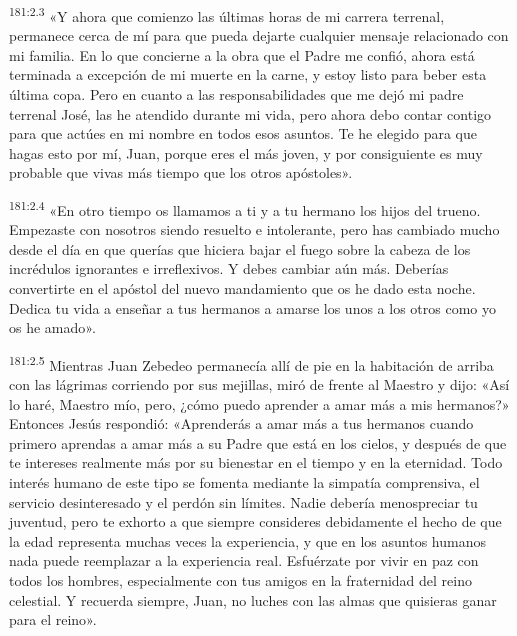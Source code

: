 \par 
\textsuperscript{181:2.3} «Y ahora que comienzo las últimas horas de mi carrera terrenal, permanece cerca de mí para que pueda dejarte cualquier mensaje relacionado con mi familia. En lo que concierne a la obra que el Padre me confió, ahora está terminada a excepción de mi muerte en la carne, y estoy listo para beber esta última copa. Pero en cuanto a las responsabilidades que me dejó mi padre terrenal José, las he atendido durante mi vida, pero ahora debo contar contigo para que actúes en mi nombre en todos esos asuntos. Te he elegido para que hagas esto por mí, Juan, porque eres el más joven, y por consiguiente es muy probable que vivas más tiempo que los otros apóstoles».

\par 
\textsuperscript{181:2.4} «En otro tiempo os llamamos a ti y a tu hermano los hijos del trueno. Empezaste con nosotros siendo resuelto e intolerante, pero has cambiado mucho desde el día en que querías que hiciera bajar el fuego sobre la cabeza de los incrédulos ignorantes e irreflexivos. Y debes cambiar aún más. Deberías convertirte en el apóstol del nuevo mandamiento que os he dado esta noche. Dedica tu vida a enseñar a tus hermanos a amarse los unos a los otros como yo os he amado».

\par 
\textsuperscript{181:2.5} Mientras Juan Zebedeo permanecía allí de pie en la habitación de arriba con las lágrimas corriendo por sus mejillas, miró de frente al Maestro y dijo: «Así lo haré, Maestro mío, pero, ¿cómo puedo aprender a amar más a mis hermanos?» Entonces Jesús respondió: «Aprenderás a amar más a tus hermanos cuando primero aprendas a amar más a su Padre que está en los cielos, y después de que te intereses realmente más por su bienestar en el tiempo y en la eternidad. Todo interés humano de este tipo se fomenta mediante la simpatía comprensiva, el servicio desinteresado y el perdón sin límites. Nadie debería menospreciar tu juventud, pero te exhorto a que siempre consideres debidamente el hecho de que la edad representa muchas veces la experiencia, y que en los asuntos humanos nada puede reemplazar a la experiencia real. Esfuérzate por vivir en paz con todos los hombres, especialmente con tus amigos en la fraternidad del reino celestial. Y recuerda siempre, Juan, no luches con las almas que quisieras ganar para el reino».

